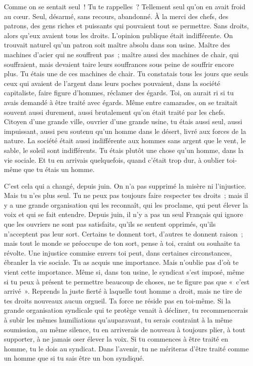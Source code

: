 \documentclass[french,twoside]{book} %
\begin{document}
Comme on se sentait seul ! Tu te rappelles ? Tellement seul qu'on en avait froid au cœur. Seul, désarmé, sans recours, abandonné. À la merci des chefs, des patrons, des gens riches et puissants qui pouvaient tout se permettre. Sans droits, alors qu'eux avaient tous les droits. L'opinion publique était indifférente. On trouvait naturel qu'un patron soit maître absolu dans son usine. Maître des machines d'acier qui ne souffrent pas ; maître aussi des machines de chair, qui souffraient, mais devaient taire leurs souffrances sous peine de souffrir encore plus. Tu étais une de ces machines de chair. Tu constatais tous les jours que seuls ceux qui avaient de l'argent dans leurs poches pouvaient, dans la société capitaliste, faire figure d'hommes, réclamer des égards. Toi, on aurait ri si tu avais demandé à être traité avec égards. Même entre camarades, on se traitait souvent aussi durement, aussi brutalement qu'on était traité par les chefs. Citoyen d'une grande ville, ouvrier d'une grande usine, tu étais aussi seul, aussi impuissant, aussi peu soutenu qu'un homme dans le désert, livré aux forces de la nature. La société était aussi indifférente aux hommes sans argent que le vent, le sable, le soleil sont indifférents. Tu étais plutôt une chose qu'un homme, dans la vie sociale. Et tu en arrivais quelquefois, quand c'était trop dur, à oublier toi-même que tu étais un homme.\par
C'est cela qui a changé, depuis juin. On n'a pas supprimé la misère ni l'injustice. Mais tu n'es plus seul. Tu ne peux pas toujours faire respecter tes droits ; mais il y a une grande organisation qui les reconnaît, qui les proclame, qui peut élever la voix et qui se fait entendre. Depuis juin, il n'y a pas un seul Français qui ignore que les ouvriers ne sont pas satisfaits, qu'ils se sentent opprimés, qu'ils n'acceptent pas leur sort. Certains te donnent tort, d'autres te donnent raison ; mais tout le monde se préoccupe de ton sort, pense à toi, craint ou souhaite ta révolte. Une injustice commise envers toi peut, dans certaines circonstances, ébranler la vie sociale. Tu as acquis une importance. Mais n'oublie pas d'où te vient cette importance. Même si, dans ton usine, le syndicat s'est imposé, même si tu peux à présent te permettre beaucoup de choses, ne te figure pas que « c'est arrivé ». Reprends la juste fierté à laquelle tout homme a droit, mais ne tire de tes droits nouveaux aucun orgueil. Ta force ne réside pas en toi-même. Si la grande organisation syndicale qui te protège venait à décliner, tu recommencerais à subir les mêmes humiliations qu'auparavant, tu serais contraint à la même soumission, au même silence, tu en arriverais de nouveau à toujours plier, à tout supporter, à ne jamais oser élever la voix. Si tu commences à être traité en homme, tu le dois au syndicat. Dans l'avenir, tu ne mériteras d'être traité comme un homme que si tu sais être un bon syndiqué.\par
\end{document}
